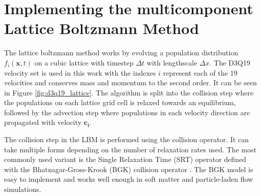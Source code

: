 \section{Implementing the multicomponent Lattice Boltzmann Method} 
\label{section:lbm_hydrodynamics}

The lattice boltzmann method works by evolving a population distribution $f_{i}(\mathbf{x}, t)$ on a cubic lattice with 
timestep $\Delta t$ with lengthscale $\Delta x$. \cite{qian_lattice_1992, succi_lattice_2018, he_theory_1997} The D3Q19 
velocity set is used in this work with the indexes $i$ represent each of the 19 velocities and conserves mass and momentum 
to the second order. It can be seen in Figure \ref{fig:d3q19_lattice}. The algorithm is split into the 
collision step where the populations on each lattice grid cell is relaxed towards an equilibrium, followed by the 
advection step where populations in each velocity direction are propagated with velocity $\mathbf{c_i}$. 



The collision step in the LBM is performed using the collision operator. It can take multiple forms depending on the number of
relaxation rates used. The most commonly used variant is the Single Relaxation Time (SRT) operator defined with the Bhatnagar-Gross-Krook (BGK) 
collision operator \cite{bhatnagar_model_1954, qian_lattice_1992}. The BGK model is easy to implement and works well enough in soft matter and
particle-laden flow simulations.

